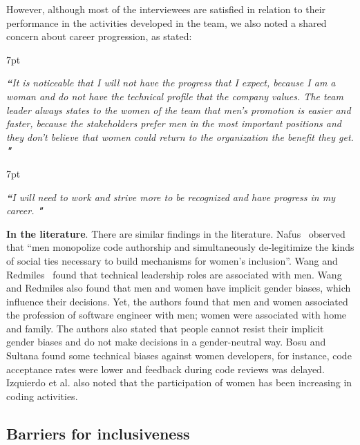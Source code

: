 \documentclass{IEEEcsmag}
\newenvironment{formal}{%
  \def\FrameCommand{%
    \hspace{1pt}%
    {\color{formalshade}\vrule width 2pt}%
    {\color{formalshade}\vrule width 4pt}%
    \colorbox{formalshade}%
  }%
  \MakeFramed{\advance\hsize-\width\FrameRestore}%
  \noindent\hspace{-4.55pt}%
  \begin{adjustwidth}{}{7pt}%
  \vspace{2pt}\vspace{2pt}%
}
{%
  \vspace{2pt}\end{adjustwidth}\endMakeFramed%
}
\begin{document}
However, although most of the interviewees are satisfied in relation to their performance in the activities developed in the team, we also noted a shared concern about career progression, as stated: 

\begin{formal}
\emph{{\bf``}It is noticeable that I will not have the progress that I expect, because I am a woman and do not have the technical profile that the company values. The team leader always states to the women of the  team that men's promotion is easier and faster, because the stakeholders prefer men in the most important positions and they don't believe that women could return to the organization the benefit they get. {\bf"}}
\end{formal} 

\begin{formal}
\emph{{\bf``}I will need to work and strive more to be recognized and have progress in my career. {\bf"}}
\end{formal} 

\vspace{0.2cm}
\noindent
\textbf{In the literature}. There are similar findings in the literature. Nafus~\cite{DBLP:journals/nms/Nafus12} observed that ``men monopolize code authorship and simultaneously de-legitimize the kinds of social ties necessary to build mechanisms for women’s inclusion”. Wang and Redmiles~\cite{DBLP:conf/icse/WangR19} found that technical leadership roles are associated with men. Wang and Redmiles also found that men and women have implicit gender biases, which influence their decisions. Yet, the authors found that men and women associated the profession of software engineer with men; women were associated with home and family. The authors also stated that people cannot resist their implicit gender biases and do not make decisions in a gender-neutral way. Bosu and Sultana \cite{DBLP:conf/esem/BosuS19} found some technical biases against women developers, for instance, code acceptance rates were lower and feedback during code reviews was delayed.
Izquierdo et al. \cite{DBLP:journals/software/IzquierdoHSR19} also noted that the participation of women has been increasing in coding activities. 

\subsection{Barriers for inclusiveness}
\label{subsec:chall}
\end{document}
